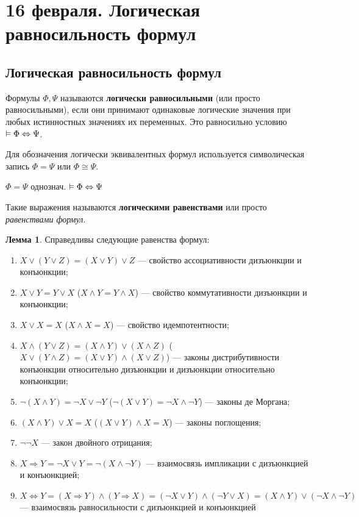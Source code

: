 \chapter{16 февраля. Логическая равносильность формул}
\section{Логическая равносильность формул}
\dftion Формулы $\Phi, \Psi$ называются \textbf{логически равносильными} (или просто равносильными), если они принимают одинаковые логические значения при любых истинностных значениях их переменных. Это равносильно условию $\vDash \Phi \Leftrightarrow \Psi$.

Для обозначения логически эквивалентных формул используется символическая запись $\Phi = \Psi$ или $\Phi \cong \Psi$.

$\Phi = \Psi$ однознач. $\vDash \Phi \Leftrightarrow \Psi$

Такие выражения называются \textbf{логическими равенствами} или просто \textit{равенствами формул}.

\textbf{Лемма 1}. Справедливы следующие равенства формул:
\begin{enumerate}
    \item $X \lor (Y \lor Z) = (X \lor Y) \lor Z$ --- свойство ассоциативности дизъюнкции и конъюнкции;
    \item $X \lor Y = Y \lor X$ ($X \land Y = Y \land X$) --- свойство коммутативности дизъюнкции и конъюнкции;
    \item $X \lor X = X$ ($X \land X = X$) --- свойство идемпотентности;
    \item $X \land (Y \lor Z) = (X \land Y) \lor (X \land Z)$ ($X \lor (Y \land Z) = (X \lor Y) \land (X \lor Z)$) --- законы дистрибутивности конъюнкции относительно дизъюнкции и дизъюнкции относительно конъюнкции;
    \item $\lnot(X \land Y) = \lnot X \lor \lnot Y$ ($\lnot(X \lor Y) = \lnot X \land \lnot Y$) --- законы де Моргана;
    \item $(X \land Y) \lor X = X$ ($(X \lor Y) \land X = X$) --- законы поглощения;
    \item $\lnot \lnot X$ --- закон двойного отрицания;
    \item $X \Rightarrow Y = \lnot X \lor Y = \lnot(X \land \lnot Y)$ --- взаимосвязь импликации с дизъюнкцией и конъюнкцией;
    \item $X \Leftrightarrow Y = (X \Rightarrow Y) \land (Y \Rightarrow X) = (\lnot X \lor Y) \land (\lnot Y \lor X) = (X \land Y) \lor (\lnot X \land \lnot Y)$ --- взаимосвязь равносильности с дизъюнкцией и конъюнкцией
\end{enumerate}

